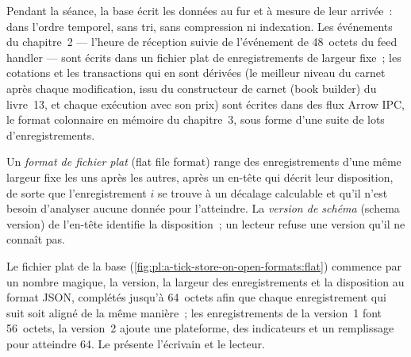 Pendant la séance, la base écrit les données au fur et à mesure de leur arrivée~: dans l'ordre temporel, sans tri, sans compression ni
indexation. Les événements du chapitre~2 --- l'heure de réception suivie de l'événement de 48~octets du feed handler --- sont écrits dans un fichier plat de
enregistrements de largeur fixe~; les cotations et les transactions qui en sont dérivées (le meilleur niveau du carnet après chaque modification, issu du constructeur de carnet (book builder) du livre~13,
et chaque exécution avec son prix) sont écrites dans des flux Arrow IPC, le format colonnaire en mémoire du chapitre~3, sous forme d'une suite de
lots d'enregistrements.

\begin{definition}\label{def:pl:a-tick-store-on-open-formats:flat}
Un \emph{format de fichier plat} (flat file format) range des enregistrements d'une même largeur fixe les uns après les autres, après un en-tête qui
décrit leur disposition, de sorte que l'enregistrement $i$ se trouve à un décalage calculable et qu'il n'est besoin d'analyser aucune donnée pour l'atteindre. La
\emph{version de schéma} (schema version) de l'en-tête identifie la disposition~; un lecteur refuse une version qu'il ne connaît pas.
\end{definition}

Le fichier plat de la base (\cref{fig:pl:a-tick-store-on-open-formats:flat}) commence par un nombre magique, la version, la largeur
des enregistrements et la disposition au format JSON, complétés jusqu'à 64~octets afin que chaque enregistrement qui suit soit aligné de la même manière~; les enregistrements de la version~1 font
56~octets, la version~2 ajoute une plateforme, des indicateurs et un remplissage pour atteindre 64. Le  présente l'écrivain et
le lecteur.

\label{lst:pl:a-tick-store-on-open-formats:flat}

